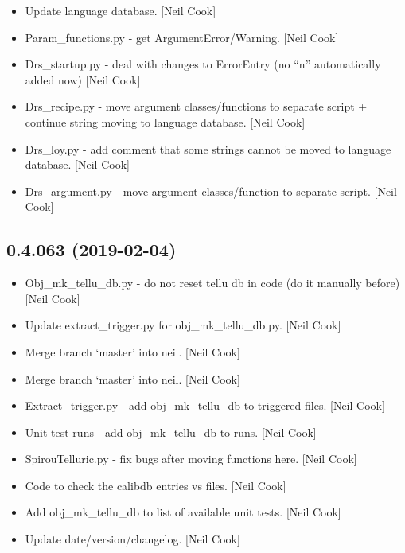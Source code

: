 \documentclass[a4paper,10pt,english]{report}
\begin{document}
\begin{itemize}
\item {} 
Update language database. {[}Neil Cook{]}

\item {} 
Param\_functions.py - get ArgumentError/Warning. {[}Neil Cook{]}

\item {} 
Drs\_startup.py - deal with changes to ErrorEntry (no “n”
automatically added now) {[}Neil Cook{]}

\item {} 
Drs\_recipe.py - move argument classes/functions to separate script +
continue string moving to language database. {[}Neil Cook{]}

\item {} 
Drs\_loy.py - add comment that some strings cannot be moved to language
database. {[}Neil Cook{]}

\item {} 
Drs\_argument.py - move argument classes/function to separate script.
{[}Neil Cook{]}

\end{itemize}


\subsection{0.4.063 (2019-02-04)}
\label{\detokenize{misc/changelog:id194}}\begin{itemize}
\item {} 
Obj\_mk\_tellu\_db.py - do not reset tellu db in code (do it manually
before) {[}Neil Cook{]}

\item {} 
Update extract\_trigger.py for obj\_mk\_tellu\_db.py. {[}Neil Cook{]}

\item {} 
Merge branch ‘master’ into neil. {[}Neil Cook{]}

\item {} 
Merge branch ‘master’ into neil. {[}Neil Cook{]}

\item {} 
Extract\_trigger.py - add obj\_mk\_tellu\_db to triggered files. {[}Neil
Cook{]}

\item {} 
Unit test runs - add obj\_mk\_tellu\_db to runs. {[}Neil Cook{]}

\item {} 
SpirouTelluric.py - fix bugs after moving functions here. {[}Neil Cook{]}

\item {} 
Code to check the calibdb entries vs files. {[}Neil Cook{]}

\item {} 
Add obj\_mk\_tellu\_db to list of available unit tests. {[}Neil Cook{]}

\item {} 
Update date/version/changelog. {[}Neil Cook{]}

\end{itemize}
\end{document}
